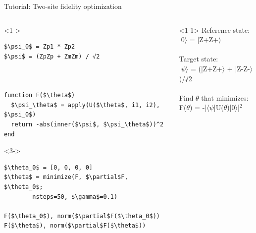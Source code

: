 \begin{frame}[fragile]{Tutorial: Two-site fidelity optimization}

\begin{columns}

\begin{column}{5cm}

\begin{onlyenv}<1->
\begin{lstlisting}[language=JuliaLocal, style=julia, mathescape, basicstyle=\small]
$\psi_0$ = Zp1 * Zp2
$\psi$ = (ZpZp + ZmZm) / √2



function F($\theta$)
  $\psi_\theta$ = apply(U($\theta$, i1, i2), $\psi_0$)
  return -abs(inner($\psi$, $\psi_\theta$))^2
end
\end{lstlisting}
\end{onlyenv}

\begin{onlyenv}<3->
\begin{lstlisting}[language=JuliaLocal, style=julia, mathescape, basicstyle=\small]
$\theta_0$ = [0, 0, 0, 0]
$\theta$ = minimize(F, $\partial$F, $\theta_0$;
        nsteps=50, $\gamma$=0.1)

F($\theta_0$), norm($\partial$F($\theta_0$))
F($\theta$), norm($\partial$F($\theta$))
 \end{lstlisting}

\end{onlyenv}
\end{column}

\begin{column}{5cm}

\begin{onlyenv}<1-1>
Reference state: \\
|0$\rangle$ = |Z+Z+$\rangle$ \\
~\\
Target state: \\
|$\psi\rangle$ = (|Z+Z+$\rangle$ + |Z-Z-$\rangle$)/√2 \\
~\\
Find $\theta$ that minimizes: \\
F($\theta$) = -|$\langle\psi$|U($\theta$)|0$\rangle$|$^2$
\end{onlyenv}


\end{column}
\end{columns}
\end{frame}
